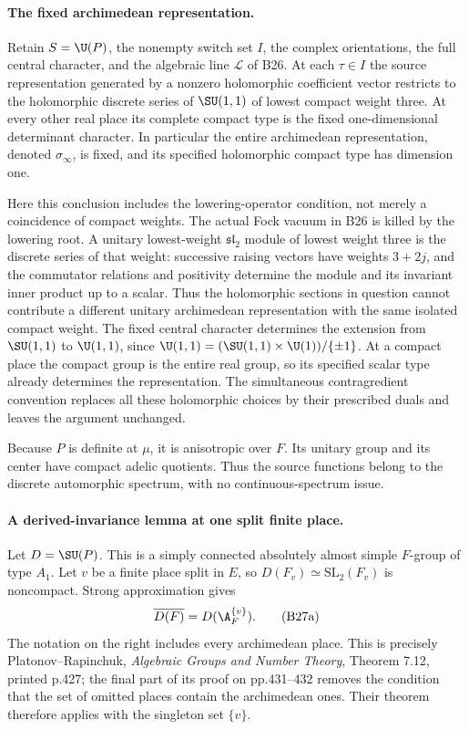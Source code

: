 \documentclass[11pt]{article}
\providecommand{\mathscr}[1]{\mathcal{#1}}
\theoremstyle{definition}\newtheorem{definition}[theorem]{Definition}\newtheorem{remark}[theorem]{Remark}
\begin{document}
\paragraph{The fixed archimedean representation.}
Retain $S=\U(P)$, the nonempty switch set $I$, the complex orientations,
the full central character, and the algebraic line $\mathscr L$ of B26.
At each $\tau\in I$ the source representation generated by a nonzero
holomorphic coefficient vector restricts to the holomorphic
discrete series of $\SU(1,1)$ of lowest compact weight three.
At every other real place its complete compact type is the fixed
one-dimensional determinant character.  In particular the entire
archimedean representation, denoted $\sigma_\infty$, is fixed, and
its specified holomorphic compact type has dimension one.

Here this conclusion includes the lowering-operator condition,
not merely a coincidence of compact weights.  The actual Fock
vacuum in B26 is killed by the lowering root.  A unitary
lowest-weight $\mathfrak{sl}_2$ module of lowest weight three is the
discrete series of that weight: successive raising vectors have
weights $3+2j$, and the commutator relations and positivity determine
the module and its invariant inner product up to a scalar.  Thus
the holomorphic sections in question cannot contribute a different
unitary archimedean representation with the same isolated compact
weight.  The fixed central character determines the extension
from $\SU(1,1)$ to $\U(1,1)$, since
$\U(1,1)=(\SU(1,1)\times\U(1))/\{\pm1\}$.
At a compact place the compact group is the entire real group,
so its specified scalar type already determines the representation.
The simultaneous contragredient convention replaces all these
holomorphic choices by their prescribed duals and leaves the
argument unchanged.

Because $P$ is definite at $\mu$, it is anisotropic over $F$.
Its unitary group and its center have compact adelic quotients.
Thus the source functions belong to the discrete automorphic
spectrum, with no continuous-spectrum issue.

\paragraph{A derived-invariance lemma at one split finite place.}
Let $D=\SU(P)$.  This is a simply connected absolutely almost
simple $F$-group of type $A_1$.  Let $v$ be a finite place split
in $E$, so $D(F_v)\simeq\mathrm{SL}_2(F_v)$ is noncompact.
Strong approximation gives
\[
       \overline{D(F)}=D(\A_F^{\{v\}}).
 \tag{B27a}
\]
The notation on the right includes every archimedean place.
This is precisely Platonov--Rapinchuk, \emph{Algebraic Groups
and Number Theory}, Theorem 7.12, printed p.427; the final part
of its proof on pp.431--432 removes the condition that the set
of omitted places contain the archimedean ones.  Their theorem
therefore applies with the singleton set $\{v\}$.
\end{document}
